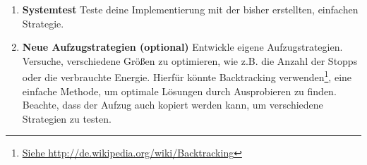 \begin{enumerate}
\begin{algorithm}[H]
{   Move Elevator to next floor; \\
   Let all arrived people off; \\
   Let all people on floor into Elevator;\\
 }
\end{algorithm}

\item \textbf{Systemtest} 
Teste deine Implementierung mit der bisher erstellten, einfachen Strategie.

\item \textbf{Neue Aufzugstrategien (optional)}
Entwickle eigene Aufzugstrategien. 
Versuche, verschiedene Größen zu optimieren, wie z.B. die Anzahl der Stopps oder die verbrauchte Energie.
Hierfür könnte Backtracking verwenden\footnote{\url{Siehe http://de.wikipedia.org/wiki/Backtracking}}, eine einfache Methode, um optimale Lösungen durch Ausprobieren zu finden. Beachte, dass der Aufzug auch kopiert werden kann, um verschiedene Strategien zu testen.

\end{enumerate}


